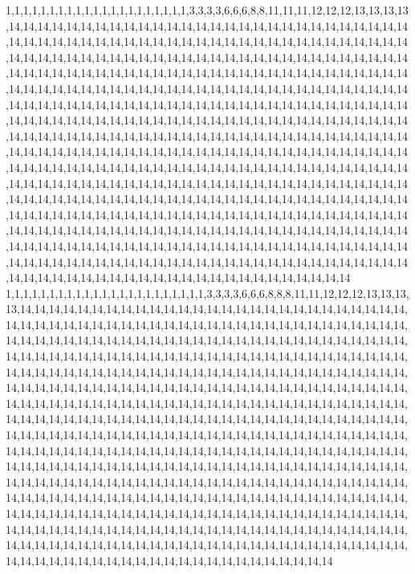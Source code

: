 1,1,1,1,1,1,1,1,1,1,1,1,1,1,1,1,1,1,1,1,1,3,3,3,3,6,6,6,8,8,11,11,11,12,12,12,13,13,13,13,14,14,14,14,14,14,14,14,14,14,14,14,14,14,14,14,14,14,14,14,14,14,14,14,14,14,14,14,14,14,14,14,14,14,14,14,14,14,14,14,14,14,14,14,14,14,14,14,14,14,14,14,14,14,14,14,14,14,14,14,14,14,14,14,14,14,14,14,14,14,14,14,14,14,14,14,14,14,14,14,14,14,14,14,14,14,14,14,14,14,14,14,14,14,14,14,14,14,14,14,14,14,14,14,14,14,14,14,14,14,14,14,14,14,14,14,14,14,14,14,14,14,14,14,14,14,14,14,14,14,14,14,14,14,14,14,14,14,14,14,14,14,14,14,14,14,14,14,14,14,14,14,14,14,14,14,14,14,14,14,14,14,14,14,14,14,14,14,14,14,14,14,14,14,14,14,14,14,14,14,14,14,14,14,14,14,14,14,14,14,14,14,14,14,14,14,14,14,14,14,14,14,14,14,14,14,14,14,14,14,14,14,14,14,14,14,14,14,14,14,14,14,14,14,14,14,14,14,14,14,14,14,14,14,14,14,14,14,14,14,14,14,14,14,14,14,14,14,14,14,14,14,14,14,14,14,14,14,14,14,14,14,14,14,14,14,14,14,14,14,14,14,14,14,14,14,14,14,14,14,14,14,14,14,14,14,14,14,14,14,14,14,14,14,14,14,14,14,14,14,14,14,14,14,14,14,14,14,14,14,14,14,14,14,14,14,14,14,14,14,14,14,14,14,14,14,14,14,14,14,14,14,14,14,14,14,14,14,14,14,14,14,14,14,14,14,14,14,14,14,14,14,14,14,14,14,14,14,14,14,14,14,14,14,14,14,14,14,14,14,14,14,14,14,14,14,14,14,14,14,14,14,14,14,14,14,14,14,14,14,14,14,14,14,14,14,14,14,14,14,14,14,14,14,14,14,14,14,14,14,14,14,14,14,14,14,14,14,14,14,14,14,14,14,14,14,14,14,14,14,14,14,14,14,14,14,14,14,14,14,14,14,14,14,14,14,14,14,14,14,14,14,14,14,14,14,14,14,14,14,14,14,14,14,14,14,14,14,14,14,14,14
1,1,1,1,1,1,1,1,1,1,1,1,1,1,1,1,1,1,1,1,1,1,1,3,3,3,3,6,6,6,8,8,8,11,11,12,12,12,13,13,13,13,14,14,14,14,14,14,14,14,14,14,14,14,14,14,14,14,14,14,14,14,14,14,14,14,14,14,14,14,14,14,14,14,14,14,14,14,14,14,14,14,14,14,14,14,14,14,14,14,14,14,14,14,14,14,14,14,14,14,14,14,14,14,14,14,14,14,14,14,14,14,14,14,14,14,14,14,14,14,14,14,14,14,14,14,14,14,14,14,14,14,14,14,14,14,14,14,14,14,14,14,14,14,14,14,14,14,14,14,14,14,14,14,14,14,14,14,14,14,14,14,14,14,14,14,14,14,14,14,14,14,14,14,14,14,14,14,14,14,14,14,14,14,14,14,14,14,14,14,14,14,14,14,14,14,14,14,14,14,14,14,14,14,14,14,14,14,14,14,14,14,14,14,14,14,14,14,14,14,14,14,14,14,14,14,14,14,14,14,14,14,14,14,14,14,14,14,14,14,14,14,14,14,14,14,14,14,14,14,14,14,14,14,14,14,14,14,14,14,14,14,14,14,14,14,14,14,14,14,14,14,14,14,14,14,14,14,14,14,14,14,14,14,14,14,14,14,14,14,14,14,14,14,14,14,14,14,14,14,14,14,14,14,14,14,14,14,14,14,14,14,14,14,14,14,14,14,14,14,14,14,14,14,14,14,14,14,14,14,14,14,14,14,14,14,14,14,14,14,14,14,14,14,14,14,14,14,14,14,14,14,14,14,14,14,14,14,14,14,14,14,14,14,14,14,14,14,14,14,14,14,14,14,14,14,14,14,14,14,14,14,14,14,14,14,14,14,14,14,14,14,14,14,14,14,14,14,14,14,14,14,14,14,14,14,14,14,14,14,14,14,14,14,14,14,14,14,14,14,14,14,14,14,14,14,14,14,14,14,14,14,14,14,14,14,14,14,14,14,14,14,14,14,14,14,14,14,14,14,14,14,14,14,14,14,14,14,14,14,14,14,14,14,14,14,14,14,14,14,14,14,14,14,14,14,14,14,14,14,14,14,14,14,14,14,14,14,14,14,14,14,14,14,14,14,14,14,14,14,14,14,14,14,14,14,14,14,14,14,14,14
